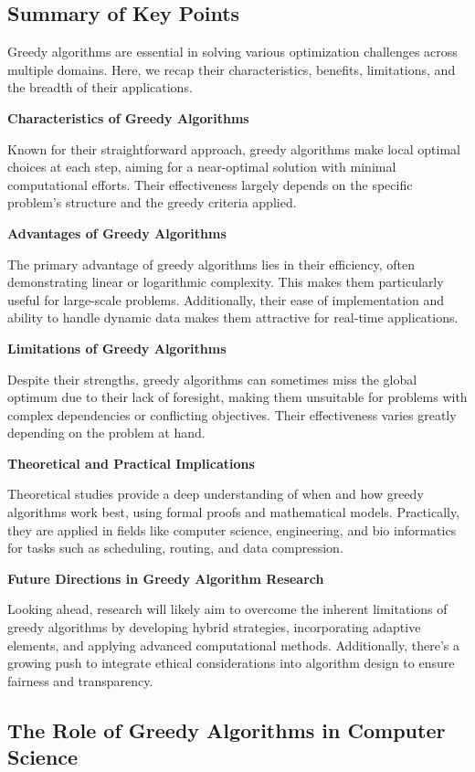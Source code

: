 \documentclass[12pt]{book} %
\begin{document}
\subsection{Summary of Key Points}
Greedy algorithms are essential in solving various optimization challenges across multiple domains. Here, we recap their characteristics, benefits, limitations, and the breadth of their applications.

\textbf{Characteristics of Greedy Algorithms}

Known for their straightforward approach, greedy algorithms make local optimal choices at each step, aiming for a near-optimal solution with minimal computational efforts. Their effectiveness largely depends on the specific problem's structure and the greedy criteria applied.

\textbf{Advantages of Greedy Algorithms}

The primary advantage of greedy algorithms lies in their efficiency, often demonstrating linear or logarithmic complexity. This makes them particularly useful for large-scale problems. Additionally, their ease of implementation and ability to handle dynamic data makes them attractive for real-time applications.

\textbf{Limitations of Greedy Algorithms}

Despite their strengths, greedy algorithms can sometimes miss the global optimum due to their lack of foresight, making them unsuitable for problems with complex dependencies or conflicting objectives. Their effectiveness varies greatly depending on the problem at hand.

\textbf{Theoretical and Practical Implications}

Theoretical studies provide a deep understanding of when and how greedy algorithms work best, using formal proofs and mathematical models. Practically, they are applied in fields like computer science, engineering, and bio informatics for tasks such as scheduling, routing, and data compression.

\textbf{Future Directions in Greedy Algorithm Research}

Looking ahead, research will likely aim to overcome the inherent limitations of greedy algorithms by developing hybrid strategies, incorporating adaptive elements, and applying advanced computational methods. Additionally, there's a growing push to integrate ethical considerations into algorithm design to ensure fairness and transparency.

\subsection{The Role of Greedy Algorithms in Computer Science}
\end{document}
